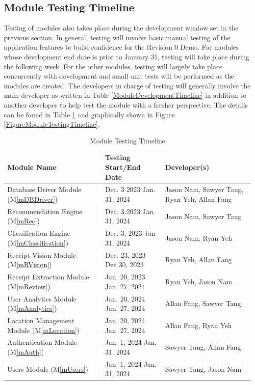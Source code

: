 \documentclass[12pt, titlepage]{article}
\newcommand{\mref}[1]{M\ref{#1}}
\begin{document}
\subsection{Module Testing Timeline}

Testing of modules also takes place during the development window set in the previous section. In general,
testing will involve basic manual testing of the application features to build confidence for the
Revision 0 Demo. For modules whose development end date is prior to January 31, testing will take place
during the following week. For the other modules, testing will largely take place concurrently with development
and small unit tests will be performed as the modules are created. The developers in charge of testing will
generally involve the main developer as written in Table \ref{ModuleDevelopmentTimeline} in addition to another developer
to help test the module with a fresher perspective. The details can be found in Table \ref{ModuleTestingTimeline} and graphically shown
in Figure \ref{FigureModuleTestingTimeline}.

\begin{table}[H]
  \caption{Module Testing Timeline}\label{ModuleTestingTimeline}
  \begin{tabular}{|p{}|p{}|p{}|}
    \hline
    \textbf{Module Name} & \textbf{Testing Start/End Date} & \textbf{Developer(s)} \\
    \hline
    Database Driver Module (\mref{mDBDriver}) & Dec. 3 2023 \textemdash{} Jan. 31, 2024 & Jason Nam, Sawyer Tang, Ryan Yeh, Allan Fang \\
    \hline
    Recommendation Engine (\mref{mRec}) & Dec. 3 2023 \textemdash{} Jan. 31, 2024 & Jason Nam, Sawyer Tang \\
    \hline
    Classification Engine (\mref{mClassification}) & Dec. 3, 2023 \textemdash{} Jan 31, 2024 & Jason Nam, Ryan Yeh\\
    \hline
    Receipt Vision Module (\mref{mRVision}) & Dec. 23, 2023 \textemdash{} Dec 30, 2023 & Ryan Yeh, Allan Fang \\
    \hline
    Receipt Extraction Module (\mref{mReview}) & Jan. 20, 2023 \textemdash{} Jan. 27, 2024 & Ryan Yeh, Jason Nam \\
    \hline
    User Analytics Module (\mref{mAnalytics}) & Jan. 20, 2024 \textemdash{} Jan. 27, 2024 & Allan Fang, Sawyer Tang \\
    \hline
    Location Management Module (\mref{mLocation}) & Jan. 20, 2024 \textemdash{} Jan. 27, 2024 & Allan Fang, Ryan Yeh \\
    \hline
    Authentication Module (\mref{mAuth}) & Jan. 1, 2024 \textemdash{} Jan. 31, 2024 & Sawyer Tang, Allan Fang \\
    \hline
    Users Module (\mref{mUsers}) & Jan. 1, 2024 \textemdash{} Jan. 31, 2024 & Sawyer Tang, Jason Nam \\
    \hline
  \end{tabular}
\end{table}
\end{document}
